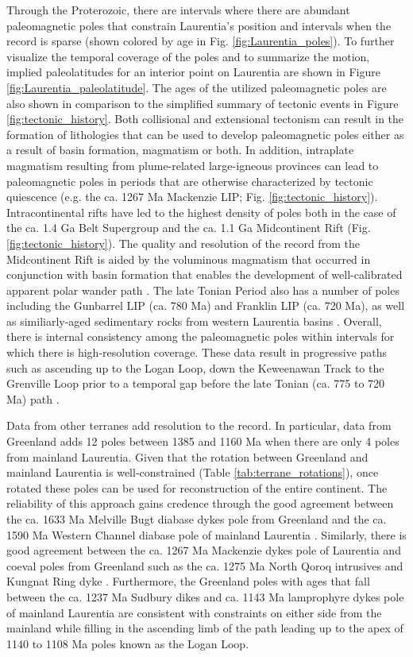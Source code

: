 \documentclass[11pt,letterpaper]{article}
\begin{document}
Through the Proterozoic, there are intervals where there are abundant paleomagnetic poles that constrain Laurentia's position and intervals when the record is sparse (shown colored by age in Fig. \ref{fig:Laurentia_poles}). To further visualize the temporal coverage of the poles and to summarize the motion, implied paleolatitudes for an interior point on Laurentia are shown in Figure \ref{fig:Laurentia_paleolatitude}. The ages of the utilized paleomagnetic poles are also shown in comparison to the simplified summary of tectonic events in Figure \ref{fig:tectonic_history}. Both collisional and extensional tectonism can result in the formation of lithologies that can be used to develop paleomagnetic poles either as a result of basin formation, magmatism or both. In addition, intraplate magmatism resulting from plume-related large-igneous provinces can lead to paleomagnetic poles in periods that are otherwise characterized by tectonic quiescence (e.g. the ca. 1267 Ma Mackenzie LIP; Fig. \ref{fig:tectonic_history}). Intracontinental rifts have led to the highest density of poles both in the case of the ca. 1.4 Ga Belt Supergroup and the ca. 1.1 Ga Midcontinent Rift (Fig. \ref{fig:tectonic_history}). The quality and resolution of the record from the Midcontinent Rift is aided by the voluminous magmatism that occurred in conjunction with basin formation that enables the development of well-calibrated apparent polar wander path \citep{Swanson-Hysell2019a}. The late Tonian Period also has a number of poles including the Gunbarrel LIP (ca. 780 Ma) and Franklin LIP (ca. 720 Ma), as well as similiarly-aged sedimentary rocks from western Laurentia basins \citep{Eyster2019a}. Overall, there is internal consistency among the paleomagnetic poles within intervals for which there is high-resolution coverage. These data result in progressive paths such as ascending up to the Logan Loop, down the Keweenawan Track \citep{Swanson-Hysell2019a} to the Grenville Loop prior to a temporal gap before the late Tonian (ca. 775 to 720 Ma) path \citep{Eyster2019a}. 

Data from other terranes add resolution to the record. In particular, data from Greenland adds 12 poles between 1385 and 1160 Ma when there are only 4 poles from mainland Laurentia. Given that the rotation between Greenland and mainland Laurentia is well-constrained (Table \ref{tab:terrane_rotations}), once rotated these poles can be used for reconstruction of the entire continent. The reliability of this approach gains credence through the good agreement between the ca. 1633 Ma Melville Bugt diabase dykes pole from Greenland \citep{Halls2011a} and the ca. 1590 Ma Western Channel diabase pole of mainland Laurentia \citep{Irving1972a}. Similarly, there is good agreement between the ca. 1267 Ma Mackenzie dykes pole of Laurentia \citep{Buchan2000a} and coeval poles from Greenland such as the ca. 1275 Ma North Qoroq intrusives \citep{Piper1992a} and Kungnat Ring dyke \citep{Piper1977a}. Furthermore, the Greenland poles with ages that fall between the ca. 1237 Ma Sudbury dikes and ca. 1143 Ma lamprophyre dykes pole of mainland Laurentia are consistent with constraints on either side from the mainland while filling in the ascending limb of the path leading up to the apex of 1140 to 1108 Ma poles known as the Logan Loop.
\end{document}
